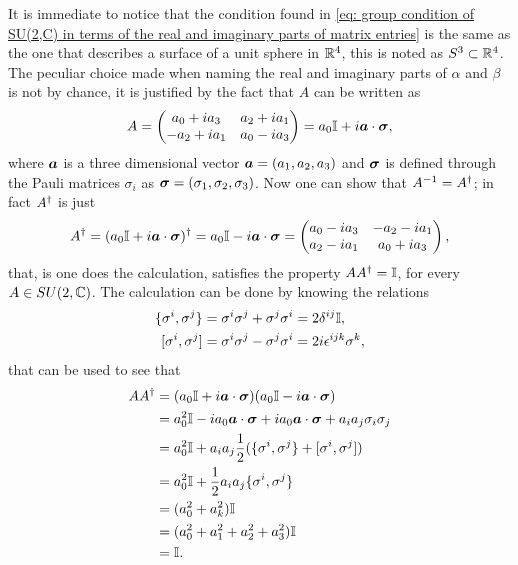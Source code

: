 It is immediate to notice that the condition found in \eqref{eq: group condition of SU(2,C) in terms of the real and imaginary parts of matrix entries} is the same as the one that describes a surface of a unit sphere in $\mathbb{R}^4$, this is noted as $S^3 \subset \mathbb{R}^4$. The peculiar choice made when naming the real and imaginary parts of $\alpha$ and $\beta$ is not by chance, it is justified by the fact that $A$ can be written as
\begin{equation}
    A = 
    \begin{pmatrix}
        a_0 + ia_3 & a_2 + ia_1 \\
        -a_2 + ia_1 & a_0 - ia_3
    \end{pmatrix}
    = a_0\mathbb{I} + i\bm{a} \cdot \bm{\sigma}, 
\end{equation}
where $\bm{a}$ is a three dimensional vector $\bm{a} = (a_1,a_2,a_3)$ and $\bm{\sigma}$ is defined through the Pauli matrices $\sigma_i$ as $\bm{\sigma} = (\sigma_1,\sigma_2,\sigma_3)$. Now one can show that $A^{-1} = A^\dagger$; in fact $A^\dagger$ is just 
\begin{equation}
    A^\dagger = (a_0\mathbb{I} + i\bm{a} \cdot \bm{\sigma})^\dagger = a_0\mathbb{I} - i\bm{a} \cdot \bm{\sigma} = 
    \begin{pmatrix}
        a_0 - ia_3 & -a_2 - ia_1 \\
        a_2 - ia_1 & a_0 + ia_3
    \end{pmatrix},
\end{equation}
that, is one does the calculation, satisfies the property $AA^\dagger = \mathbb{I}$, for every $A \in SU(2,\mathbb{C})$. The calculation can be done by knowing the relations 
\begin{align}
    \acomm{\sigma^i}{\sigma^j} &= \sigma^i\sigma^j + \sigma^j\sigma^i = 2\delta^{ij}\MI, \\
    \comm{\sigma^i}{\sigma^j} &= \sigma^i\sigma^j - \sigma^j\sigma^i = 2i\epsilon^{ijk}\sigma^k,
\end{align}
that can be used to see that
\begin{equation}
    \begin{split}
        AA^\dagger &= (a_0\mathbb{I} + i\bm{a} \cdot \bm{\sigma})(a_0\mathbb{I} - i\bm{a} \cdot \bm{\sigma}) \\
        &= a_0^2\mathbb{I} - ia_0\bm{a} \cdot \bm{\sigma} + ia_0\bm{a} \cdot \bm{\sigma} + a_ia_j\sigma_i\sigma_j \\
        &= a_0^2\mathbb{I} + a_ia_j\frac{1}{2}(\{\sigma^i,\sigma^j\} + [\sigma^i,\sigma^j]) \\
        &= a_0^2\mathbb{I} + \frac{1}{2}a_ia_j\{\sigma^i,\sigma^j\} \\
        &= (a_0^2 + a_k^2)\mathbb{I} \\
        &= (a_0^2 + a_1^2 + a_2^2 + a_3^2)\mathbb{I} \\
        &= \mathbb{I}.
    \end{split}
\end{equation}
